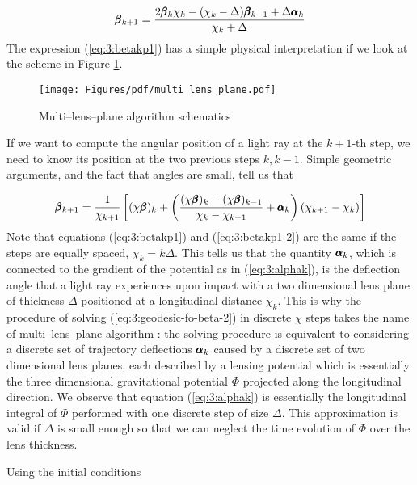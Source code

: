 \begin{equation}
\label{eq:3:betakp1}
\pmb{\beta}_{k+1} = \frac{2\pmb{\beta}_k\chi_k-(\chi_k-\Delta)\pmb{\beta}_{k-1}+\Delta\pmb{\alpha}_k}{\chi_k+\Delta}
\end{equation}  
%
The expression (\ref{eq:3:betakp1}) has a simple physical interpretation if we look at the scheme in Figure \ref{fig:3:multi-lens-plane}.
\begin{figure}
\begin{center}
\texttt{[image: Figures/pdf/multi\_lens\_plane.pdf]}
\end{center}
\caption{Multi--lens--plane algorithm schematics}
\label{fig:3:multi-lens-plane}
\end{figure}
%
If we want to compute the angular position of a light ray at the $k+1$-th step, we need to know its position at the two previous steps $k,k-1$. Simple geometric arguments, and the fact that angles are small, tell us that 

\begin{equation}
\label{eq:3:betakp1-2}
\pmb{\beta}_{k+1} = \frac{1}{\chi_{k+1}}\left[(\chi\pmb{\beta})_{k} + \left(\frac{(\chi\pmb{\beta})_{k}-(\chi\pmb{\beta})_{k-1}}{\chi_k-\chi_{k-1}}+\pmb{\alpha}_k\right)(\chi_{k+1}-\chi_k) \right]
\end{equation}
%
Note that equations (\ref{eq:3:betakp1}) and (\ref{eq:3:betakp1-2}) are the same if the steps are equally spaced, $\chi_k=k\Delta$. This tells us that the quantity $\pmb{\alpha}_k$, which is connected to the gradient of the potential as in (\ref{eq:3:alphak}), is the deflection angle that a light ray experiences upon impact with a two dimensional lens plane of thickness $\Delta$ positioned at a longitudinal distance $\chi_k$. This is why the procedure of solving (\ref{eq:3:geodesic-fo-beta-2}) in discrete $\chi$ steps takes the name of multi--lens--plane algorithm \citep{RayTracingJain,RayTracingHartlap}: the solving procedure is equivalent to considering a discrete set of trajectory deflections $\pmb{\alpha}_k$ caused by a discrete set of two dimensional lens planes, each described by a lensing potential which is essentially the three dimensional gravitational potential $\Phi$ projected along the longitudinal direction. We observe that equation (\ref{eq:3:alphak}) is essentially the longitudinal integral of $\Phi$ performed with one discrete step of size $\Delta$. This approximation is valid if $\Delta$ is small enough so that we can neglect the time evolution of $\Phi$ over the lens thickness. 

Using the initial conditions

